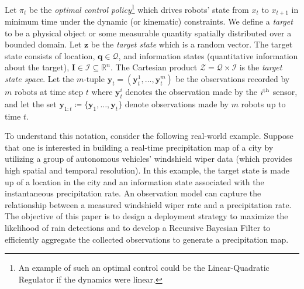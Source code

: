 \documentclass[letterpaper, 10 pt, conference]{ieeeconf}
\newcommand{\Ram}[1]{{\normalsize{\textbf{({\color{green}Ram:\ }#1)}}}}
\begin{document}
Let $\pi_t$ be the \emph{optimal control policy}\footnote{An example of such an optimal control could be the Linear-Quadratic Regulator if the dynamics were linear.} which drives robots' state from $x_t$ to $x_{t+1}$ in minimum time under the dynamic (or kinematic) constraints.
We define a \emph{target} to be a physical object or some measurable quantity spatially distributed over a bounded domain.
Let $\bm{z}$ be the \emph{target state} which is a random vector. 
The target state consists of location, $\bm{q} \in \mathcal{Q}$, and information states (quantitative information about the target), $\bm{I} \in \mathcal{I} \subseteq \mathbb{R}^n$. 
The Cartesian product $\mathcal{Z} = \mathcal{Q} \times \mathcal{I}$ is the \emph{target state space}.
Let the $m$-tuple $\bm{y}_t=(\bm{y}_t^1,\dots,\bm{y}_t^m)$ be the observations recorded by $m$ robots at time step $t$ where $\bm{y}_t^i$ denotes the observation made by the $i^{\textup{th}}$ sensor, and let the set $\bm{y}_{1:t}\coloneqq \lbrace \bm{y}_1,\dots,\bm{y}_t \rbrace$ denote observations made by $m$ robots up to time $t$. 

To understand this notation, consider the following real-world example.
Suppose that one is interested in building a real-time precipitation map of a city by utilizing a group of autonomous vehicles' windshield wiper data (which provides high spatial and temporal resolution).
In this example, the target state is made up of a location in the city and an information state associated with the instantaneous precipitation rate.
An observation model can capture the relationship between a measured windshield wiper rate and a precipitation rate. 
The objective of this paper is to design a deployment strategy to maximize the likelihood of rain detections and to develop a Recursive Bayesian Filter to efficiently aggregate the collected observations to generate a precipitation map.
\end{document}
